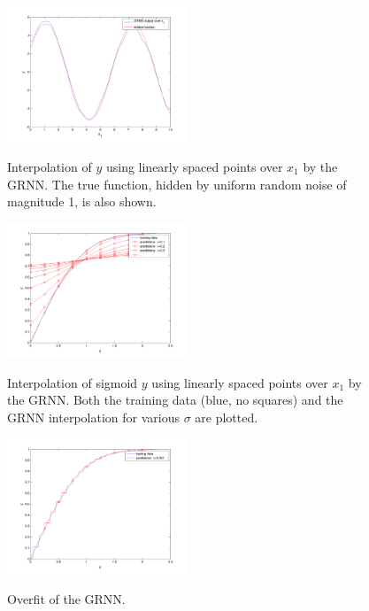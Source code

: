 \documentclass[pre,twocolumn,twoside,byrevtex,superscriptaddress]{revtex4}
\begin{document}
\begin{figure}
 \centering
  \includegraphics[width=0.48\textwidth]{../figures/GRNN-allx.png}
  \label{fig:2}
  \caption{Interpolation of $y$ using linearly spaced points over $x_1$ by the GRNN. The true function, hidden by uniform random noise of magnitude 1, is also shown.}
\end{figure}

\begin{figure}
 \centering
  \includegraphics[width=0.48\textwidth]{../figures/GRNN-givenData-allsigma.png}
  \label{fig:3}
  \caption{Interpolation of sigmoid $y$ using linearly spaced points over $x_1$ by the GRNN. Both the training data (blue, no squares) and the GRNN interpolation for various $\sigma$ are plotted.}
\end{figure}

\begin{figure}
 \centering
  \includegraphics[width=0.48\textwidth]{../figures/GRNN-givenData-sigma0-001-sqdiff.png}
  \label{fig:4}
  \caption{Overfit of the GRNN.}
\end{figure}
\end{document}
